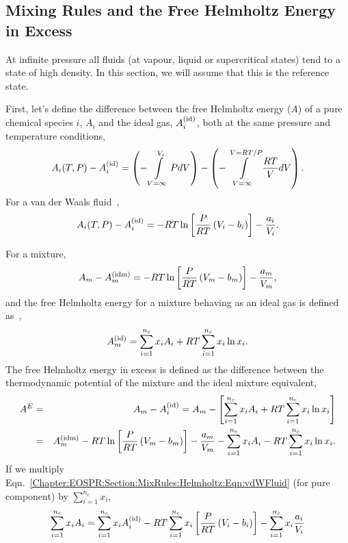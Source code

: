 \subsection{Mixing Rules and the Free Helmholtz Energy in Excess}\label{Chapter:EOSPR:Section:MixRules:Helmholtz}
At infinite pressure all fluids (at vapour, liquid or supercritical states) tend to a state of high density. In this section, we will assume that this is the reference state. 

First, let's define the difference between the free Helmholtz energy ($A$) of a pure chemical species $i$, $A_{i}$ and the ideal gas, $\mfr[A]{i}{\text{id}}$, both at the same pressure and temperature conditions,
   \begin{equation}
      A_{i}(T,P) - \mfr[A]{i}{\text{id}} = \left(-\int\limits_{V=\infty}^{V_{i}} PdV\right) - \left(-\int\limits_{V=\infty}^{V=RT/P}\frc{RT}{V}dV\right).
   \end{equation}
For a van der Waals fluid~\citep{SmithVanNess_Book},
   \begin{equation}
      A_{i}(T,P) - \mfr[A]{i}{\text{id}} = -RT\ln{\left[\frc{P}{RT}\left(V_{i}-b_{i}\right)\right] - \frc{a_{i}}{V_{i}}}.\label{Chapter:EOSPR:Section:MixRules:Helmholtz:Eqn:vdWFluid}
   \end{equation}

For a mixture,
   \begin{equation}
      A_{m} - \mfr[A]{m}{\text{idm}} = -RT\ln{\left[\frc{P}{RT}\left(V_{m}-b_{m}\right)\right] - \frc{a_{m}}{V_{m}}},\label{Chapter:EOSPR:Section:MixRules:Helmholtz:Eqn:vdWFluid2}
   \end{equation}
and the free Helmholtz energy for a mixture behaving as an ideal gas is defined as~\citep{Sandler_Book},
   \begin{equation}
      \mfr[A]{m}{\text{id}} = \summation_{i=1}^{n_{c}} x_{i}A_{i} + RT\summation_{i=1}^{n_{c}}x_{i}\ln{x_{i}}.
   \end{equation}
 The free Helmholtz energy in excess is defined as the difference between the thermodynamic potential of the mixture and the ideal mixture equivalent,
   \begin{eqnarray}
      A^{E} &=& A_{m} - \mfr[A]{i}{\text{id}} = A_{m} - \left[\summation_{i=1}^{n_{c}} x_{i}A_{i} + RT\summation_{i=1}^{n_{c}}x_{i}\ln{x_{i}}\right] \nonumber \\
           &=& \mfr[A]{m}{\text{idm}} - RT\ln{\left[\frc{P}{RT}\left(V_{m}-b_{m}\right)\right] - \frc{a_{m}}{V_{m}}} - \summation_{i=1}^{n_{c}} x_{i}A_{i} - RT\summation_{i=1}^{n_{c}}x_{i}\ln{x_{i}}.\label{Chapter:EOSPR:Section:MixRules:Helmholtz:Eqn:HelmholtzExcess}
   \end{eqnarray}
If we multiply Eqn.~\ref{Chapter:EOSPR:Section:MixRules:Helmholtz:Eqn:vdWFluid} (for pure component) by $\sum\limits_{i=1}^{n_{c}}x_{i}$,
   \begin{equation}
      \sum\limits_{i=1}^{n_{c}}x_{i}A_{i} = \sum\limits_{i=1}^{n_{c}}x_{i}\mfr[A]{i}{\text{id}} - RT\sum\limits_{i=1}^{n_{c}}x_{i}\left[\frc{P}{RT}\left(V_{i}-b_{i}\right)\right] - \sum\limits_{i=1}^{n_{c}}x_{i}\frc{a_{i}}{V_{i}}
   \end{equation}

